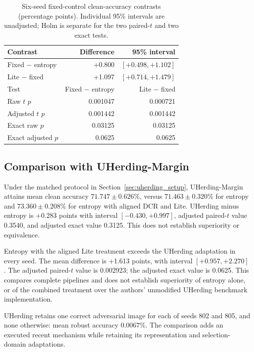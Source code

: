 \documentclass[10pt,a4paper,twocolumn]{article}
\begin{document}
\begin{table}[tbp]
\caption{Six-seed fixed-control clean-accuracy contrasts (percentage
points). Individual 95\% intervals are unadjusted; Holm is separate for
the two paired-$t$ and two exact tests.}
\label{tab:entropy_fixed_tests}
\centering\footnotesize
\begin{tabularx}{\linewidth}{@{}Yrr@{}}
\toprule
Contrast & Difference & 95\% interval \\
\midrule
Fixed $-$ entropy & +0.800 & $[+0.498,+1.102]$ \\
Lite $-$ fixed & +1.097 & $[+0.714,+1.479]$ \\
\midrule
Test & Fixed $-$ entropy & Lite $-$ fixed \\
Raw $t$ $p$ & 0.001047 & 0.000721 \\
Adjusted $t$ $p$ & 0.001442 & 0.001442 \\
Exact raw $p$ & 0.03125 & 0.03125 \\
Exact adjusted $p$ & 0.0625 & 0.0625 \\
\bottomrule
\end{tabularx}
\end{table}


\subsection{Comparison with UHerding-Margin}
\label{sec:uherding_results}

Under the matched protocol in Section~\ref{sec:uherding_setup},
UHerding-Margin attains mean clean accuracy $71.747\pm0.626\%$,
versus $71.463\pm0.320\%$ for entropy and
$73.360\pm0.208\%$ for entropy with aligned DCR and Lite.
UHerding minus entropy is +0.283 points with
interval $[-0.430,+0.997]$, adjusted paired-$t$ value
0.3540, and adjusted exact value 0.3125.
This does not establish superiority or equivalence.

Entropy with the aligned Lite treatment exceeds the UHerding
adaptation in every seed. The mean difference is +1.613 points,
with interval $[+0.957,+2.270]$.
The adjusted paired-$t$ value is 0.002923;
the adjusted exact value is 0.0625.
This compares complete pipelines and does not establish
superiority of entropy alone, or of the combined treatment
over the authors' unmodified UHerding benchmark implementation.


UHerding retains one correct adversarial image for each of
seeds 802 and 805, and none otherwise:
mean robust accuracy $0.0067\%$.
The comparison adds an executed recent mechanism while retaining
its representation and selection-domain adaptations.
\end{document}
